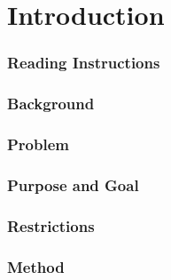 \chapter{Introduction}

\setcounter{section}{2}
\setcounter{subsection}{0}

\subsection{Reading Instructions}

\subsection{Background}

\subsection{Problem}

\subsection{Purpose and Goal}

\subsection{Restrictions}

\subsection{Method}

